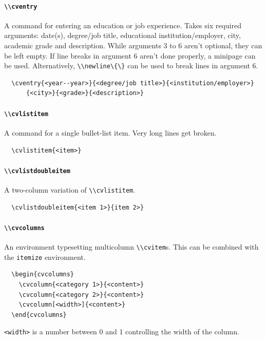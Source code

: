 \documentclass[a4paper, 11pt]{article}
\newcommand{\code}[1]{\lstinline!#1!}
\begin{document}
\paragraph{\code{\\cventry}}
A command for entering an education or job experience.
Takes six required arguments: date(s), degree/job title, educational institution/employer, city, academic grade and description.
While arguments 3 to 6 aren't optional, they can be left empty.
If line breaks in argument 6 aren't done properly, a minipage can be used.
Alternatively, \code{\\newline\{\}} can be used to break lines in argument 6.
\begin{lstlisting}
  \cventry{<year--year>}{<degree/job title>}{<institution/employer>}
      {<city>}{<grade>}{<description>}
\end{lstlisting}

\paragraph{\code{\\cvlistitem}}
A command for a single bullet-list item.
Very long lines get broken.
\begin{lstlisting}
  \cvlistitem{<item>}
\end{lstlisting}

\paragraph{\code{\\cvlistdoubleitem}}
A two-column variation of \code{\\cvlistitem}.
\begin{lstlisting}
  \cvlistdoubleitem{<item 1>}{item 2>}
\end{lstlisting}

\paragraph{\code{\\cvcolumns}}
An environment typesetting multicolumn \code{\\cvitem}s.
This can be combined with the \code{itemize} environment.
\begin{lstlisting}
  \begin{cvcolumns}
    \cvcolumn{<category 1>}{<content>}
    \cvcolumn{<category 2>}{<content>}
    \cvcolumn[<width>]{<content>}
  \end{cvcolumns}
\end{lstlisting}
\code{<width>} is a number between 0 and 1 controlling the width of the column.
\end{document}
